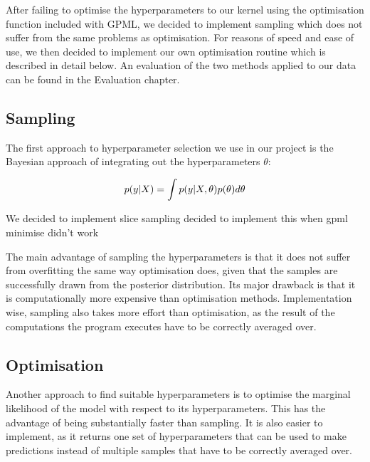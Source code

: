 \documentclass[a4paper,12pt,twoside,openright]{report}
\begin{document}
After failing to optimise the hyperparameters to our kernel using the optimisation function included with GPML, we decided to implement sampling which does not suffer from the same problems as optimisation. For reasons of speed and ease of use, we then decided to implement our own optimisation routine which is described in detail below. An evaluation of the two methods applied to our data can be found in the Evaluation chapter.


\subsection{Sampling}
The first approach to hyperparameter selection we use in our project is the Bayesian approach of integrating out the hyperparameters $\theta$:

\begin{equation}
p(y|X) = \int p(y|X,\theta)p(\theta)d\theta\\
\end{equation}

We decided to implement slice sampling
decided to implement this when gpml minimise didn't work

The main advantage of sampling the hyperparameters is that it does not suffer from overfitting the same way optimisation does, given that the samples are successfully drawn from the posterior distribution. Its major drawback is that it is computationally more expensive than optimisation methods. Implementation wise, sampling also takes more effort than optimisation, as the result of the computations the program executes have to be correctly averaged over.








\subsection{Optimisation}
Another approach to find suitable hyperparameters is to optimise the marginal likelihood of the model with respect to its hyperparameters. This has the advantage of being substantially faster than sampling. It is also easier to implement, as it returns one set of hyperparameters that can be used to make predictions instead of multiple samples that have to be correctly averaged over.
\end{document}
